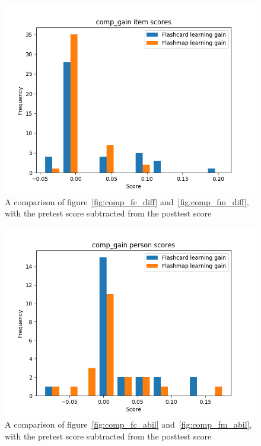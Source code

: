 \begin{figure}
    \centering
    \includegraphics[width=.7\textwidth]{img/comp_gain_diff.png}
    \caption{A comparison of figure~\protect\ref{fig:comp_fc_diff} and~\protect\ref{fig:comp_fm_diff}, with the pretest score subtracted from the posttest score}
    \label{fig:comp_gain_diff}
\end{figure}
\begin{figure}
    \centering
    \includegraphics[width=.7\textwidth]{img/comp_gain_abil.png}
    \caption{A comparison of figure~\protect\ref{fig:comp_fc_abil} and~\protect\ref{fig:comp_fm_abil}, with the pretest score subtracted from the posttest score}
    \label{fig:comp_gain_abil}
\end{figure}
